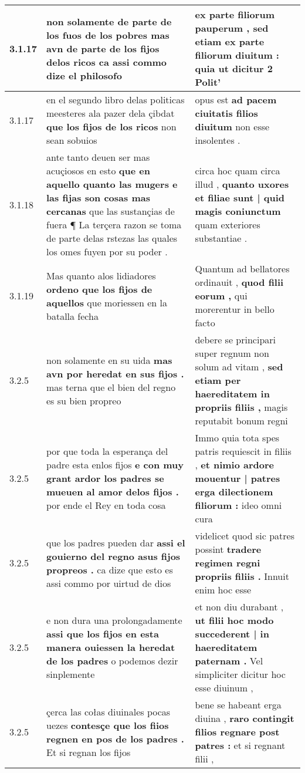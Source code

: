 \begin{tabular}{|p{1cm}|p{6.5cm}|p{6.5cm}|}
3.1.17 & non solamente de parte de los fuos de los pobres \textbf{ mas avn de parte de los fijos delos ricos } ca assi commo dize el philosofo & ex parte filiorum pauperum , \textbf{ sed etiam ex parte filiorum diuitum : } quia ut dicitur 2 Polit’ \\\hline
3.1.17 & en el segundo libro delas politicas meesteres ala pazer dela çibdat \textbf{ que los fijos de los ricos } non sean sobuios & opus est \textbf{ ad pacem ciuitatis filios diuitum } non esse insolentes . \\\hline
3.1.18 & ante tanto deuen ser mas acuçiosos en esto \textbf{ que en aquello quanto las mugers e las fijas son cosas mas cercanas } que las sustançias de fuera ¶ La terçera razon se toma de parte delas rstezas las quales los omes fuyen por su poder . & circa hoc quam circa illud , \textbf{ quanto uxores et filiae sunt | quid magis coniunctum } quam exteriores substantiae . \\\hline
3.1.19 & Mas quanto alos lidiadores \textbf{ ordeno que los fijos de aquellos } que moriessen en la batalla fecha & Quantum ad bellatores ordinauit , \textbf{ quod filii eorum , } qui morerentur in bello facto \\\hline
3.2.5 & non solamente en su uida \textbf{ mas avn por heredat en sus fijos . } mas terna que el bien del regno es su bien propreo & debere se principari super regnum non solum ad vitam , \textbf{ sed etiam per haereditatem in propriis filiis , } magis reputabit bonum regni \\\hline
3.2.5 & por que toda la esperança del padre esta enlos fijos \textbf{ e con muy grant ardor los padres se mueuen al amor delos fijos . } por ende el Rey en toda cosa & Immo quia tota spes patris requiescit in filiis , \textbf{ et nimio ardore mouentur | patres erga dilectionem filiorum : } ideo omni cura \\\hline
3.2.5 & que los padres pueden dar \textbf{ assi el gouierno del regno asus fijos propreos . } ca dize que esto es assi commo por uirtud de dios & videlicet quod sic patres possint \textbf{ tradere regimen regni propriis filiis . } Innuit enim hoc esse \\\hline
3.2.5 & e non dura una prolongadamente \textbf{ assi que los fijos en esta manera ouiessen la heredat de los padres } o podemos dezir sinplemente & et non diu durabant , \textbf{ ut filii hoc modo succederent | in haereditatem paternam . } Vel simpliciter dicitur hoc esse diuinum , \\\hline
3.2.5 & çerca las cołas diuinales pocas uezes \textbf{ contesçe que los fiios regnen en pos de los padres . } Et si regnan los fijos & bene se habeant erga diuina , \textbf{ raro contingit filios regnare post patres : } et si regnant filii , \\\hline

\end{tabular}
